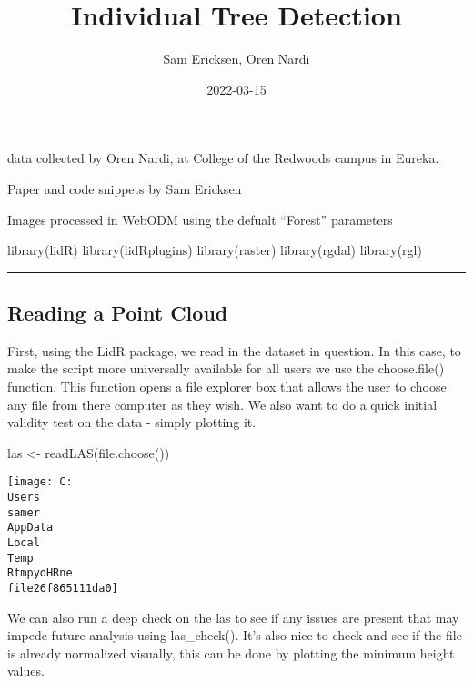 \documentclass[
]{article}
\title{Individual Tree Detection}
\author{Sam Ericksen, Oren Nardi}
\date{2022-03-15}
\newenvironment{Shaded}{\begin{snugshade}}{\end{snugshade}}
\newcommand{\FunctionTok}[1]{\textcolor[rgb]{0.00,0.00,0.00}{#1}}
\newcommand{\NormalTok}[1]{#1}
\newcommand{\OtherTok}[1]{\textcolor[rgb]{0.56,0.35,0.01}{#1}}
\begin{document}
\maketitle

data collected by Oren Nardi, at College of the Redwoods campus in
Eureka.

Paper and code snippets by Sam Ericksen

Images processed in WebODM using the defualt ``Forest'' parameters

\begin{Shaded}
\begin{Highlighting}[]
\FunctionTok{library}\NormalTok{(lidR)}
\FunctionTok{library}\NormalTok{(lidRplugins)}
\FunctionTok{library}\NormalTok{(raster)}
\FunctionTok{library}\NormalTok{(rgdal)}
\FunctionTok{library}\NormalTok{(rgl)}
\end{Highlighting}
\end{Shaded}

\begin{center}\rule{0.5\linewidth}{0.5pt}\end{center}

\hypertarget{reading-a-point-cloud}{%
\subsection{Reading a Point Cloud}\label{reading-a-point-cloud}}

First, using the LidR package, we read in the dataset in question. In
this case, to make the script more universally available for all users
we use the choose.file() function. This function opens a file explorer
box that allows the user to choose any file from there computer as they
wish. We also want to do a quick initial validity test on the data -
simply plotting it.

\begin{Shaded}
\begin{Highlighting}[]
\NormalTok{las }\OtherTok{\textless{}{-}} \FunctionTok{readLAS}\NormalTok{(}\FunctionTok{file.choose}\NormalTok{())}
\end{Highlighting}
\end{Shaded}

\texttt{[image: C:\\Users\\samer\\AppData\\Local\\Temp\\RtmpyoHRne\\file26f865111da0]}

We can also run a deep check on the las to see if any issues are present
that may impede future analysis using las\_check(). It's also nice to
check and see if the file is already normalized visually, this can be
done by plotting the minimum height values.
\end{document}
